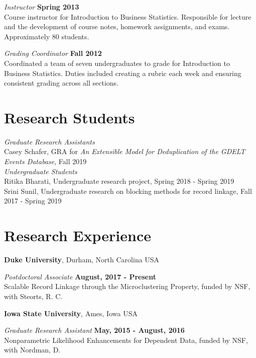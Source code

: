 \documentclass[margin,line]{res}
\begin{document}
\begin{resume}
{\em Instructor} \hfill {\bf Spring 2013}\\
Course instructor for Introduction to Business Statistics. Responsible for lecture and the development of course notes, homework assignments, and exams. Approximately 80 students.

{\em Grading Coordinator} \hfill {\bf Fall 2012}\\
Coordinated a team of seven undergraduates to grade for Introduction to Business Statistics. Duties included creating a rubric each week and ensuring consistent grading across all sections.

\section{\sc Research Students}

{\em Graduate Research Assistants} \hfill \\
Casey Schafer, GRA for {\em An Extensible Model for Deduplication of the GDELT Events Database}, Fall 2019 \\

{\em Undergraduate Students} \hfill \\
Ritika Bharati, Undergraduate research project, Spring 2018 - Spring 2019\\
Srini Sunil, Undergraduate research on blocking methods for record linkage, Fall 2017 - Spring 2019


\section{\sc Research Experience}
{\bf Duke University}, Durham, North Carolina USA

\vspace{-.3cm}
{\em Postdoctoral Associate} \hfill {\bf August, 2017 - Present}\\
Scalable Record Linkage through the Microclustering Property, funded by NSF, with Steorts, R. C.

{\bf Iowa State University}, Ames, Iowa USA

\vspace{-.3cm}

{\em Graduate Research Assistant} \hfill {\bf May, 2015 - August, 2016}\\
Nonparametric Likelihood Enhancements for Dependent Data, funded by NSF, with Nordman, D.


\end{resume}
\end{document}

